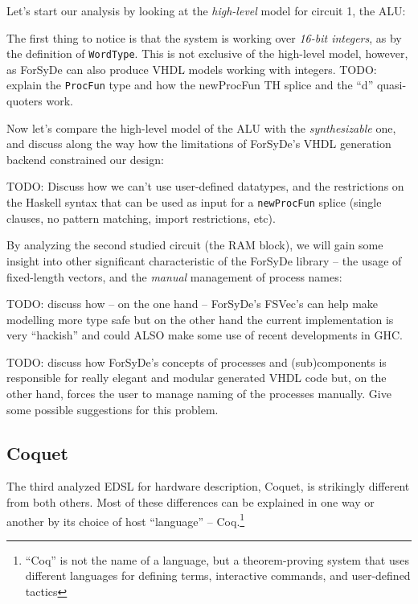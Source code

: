 \documentclass[a4paper]{article}
\begin{document}
                Let's start our analysis by looking at the \emph{high-level} model for circuit 1,
                the ALU:
                

                The first thing to notice is that the system is working over \emph{16-bit integers},
                as by the definition of \texttt{WordType}. This is not exclusive of the high-level
                model, however, as ForSyDe can also produce VHDL models working with integers.
                TODO: explain the \texttt{ProcFun} type and how the newProcFun TH splice and the
                ``d'' quasi-quoters work.

                Now let's compare the high-level model of the ALU with the \emph{synthesizable} one,
                and discuss along the way how the limitations of ForSyDe's VHDL generation backend
                constrained our design:
                

                TODO: Discuss how we can't use user-defined datatypes, and the restrictions on the
                Haskell syntax that can be used as input for a \texttt{newProcFun} splice (single
                clauses, no pattern matching, import restrictions, etc).

                By analyzing the second studied circuit (the RAM block), we will gain some insight
                into other significant characteristic of the ForSyDe library -- the usage of
                fixed-length vectors, and the \emph{manual} management of process names:

                TODO: discuss how -- on the one hand -- ForSyDe's FSVec's can help make modelling
                more type safe but on the other hand the current implementation is very ``hackish''
                and could ALSO make some use of recent developments in GHC.

                TODO: discuss how ForSyDe's concepts of processes and (sub)components is responsible
                for really elegant and modular generated VHDL code but, on the other hand, forces
                the user to manage naming of the processes manually. Give some possible suggestions
                for this problem.

        \subsection{Coquet}
        \label{subsec:coquet}
            The third analyzed EDSL for hardware description, Coquet\cite{coquet2011},
            is strikingly different from both others. Most of these differences can be explained in
            one way or another by its choice of host ``language'' -- Coq.\footnote{``Coq'' is not
                the name of a language, but a theorem-proving system that uses different languages
                for defining terms, interactive commands, and user-defined tactics}
\end{document}
